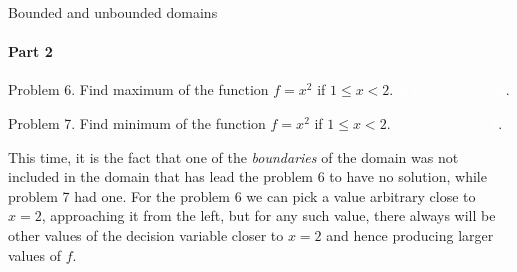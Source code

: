 \documentclass{beamer}
\begin{document}
\begin{frame}{Bounded and unbounded domains}
	\framesubtitle{Part 2}
	\begin{flushleft}
		
		Problem 6. Find maximum of the function $f = x^2$ if $1 \leq x < 2$. \textcolor{white}{It has no solution}.
		
		\bigskip
		
		Problem 7. Find minimum of the function $f = x^2$ if $1 \leq x < 2$. \textcolor{white}{Solution is $x = 1$}.
		
		\bigskip
		
		This time, it is the fact that one of the \emph{boundaries} of the domain was not included in the domain that has lead the problem 6 to have no solution, while problem 7 had one. For the problem 6 we can pick a value arbitrary close to $x = 2$, approaching it from the left, but for any such value, there always will be other values of the decision variable closer to $x = 2$ and hence producing larger values of $f$.
		
	\end{flushleft}
\end{frame}
\end{document}

